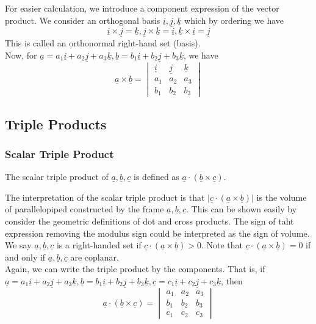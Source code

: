 For easier calculation, we introduce a component expression of the vector product.
We consider an orthogonal basis $\underline{i},\underline{j},\underline{k}$ which by ordering we have
$$\underline{i}\times\underline{j}=\underline{k},\underline{j}\times\underline{k}=\underline{i},\underline{k}\times\underline{i}=\underline{j}$$
This is called an orthonormal right-hand set (basis).\\
Now, for $\underline{a}=a_1\underline{i}+a_2\underline{j}+a_3\underline{k},\underline{b}=b_1\underline{i}+b_2\underline{j}+b_3\underline{k}$, we have
$$\underline{a}\times\underline{b}=
\begin{vmatrix}
    \underline{i}&\underline{j}&\underline{k}\\
    a_1&a_2&a_3\\
    b_1&b_2&b_3
\end{vmatrix}
$$
\subsection{Triple Products}
\subsubsection{Scalar Triple Product}
\begin{definition}
    The scalar triple product of $\underline{a},\underline{b},\underline{c}$ is defined as $\underline{a}\cdot(\underline{b}\times\underline{c})$.
\end{definition}
The interpretation of the scalar triple product is that $|\underline{c}\cdot(\underline{a}\times\underline{b})|$ is the volume of parallelopiped constructed by the frame $\underline{a},\underline{b},\underline{c}$.
This can be shown easily by consider the geometric definitions of dot and cross products.
The sign of taht expression removing the modulus sign could be interpreted as the sign of volume.
We say $\underline{a},\underline{b},\underline{c}$ is a right-handed set if $\underline{c}\cdot(\underline{a}\times\underline{b})>0$.
Note that $\underline{c}\cdot(\underline{a}\times\underline{b})=0$ if and only if $\underline{a},\underline{b},\underline{c}$ are coplanar.\\
Again, we can write the triple product by the components.
That is, if $\underline{a}=a_1\underline{i}+a_2\underline{j}+a_3\underline{k},\underline{b}=b_1\underline{i}+b_2\underline{j}+b_3\underline{k},\underline{c}=c_1\underline{i}+c_2\underline{j}+c_3\underline{k}$, then
$$\underline{a}\cdot(\underline{b}\times\underline{c})=
\begin{vmatrix}
    a_1&a_2&a_3\\
    b_1&b_2&b_3\\
    c_1&c_2&c_3
\end{vmatrix}
$$
